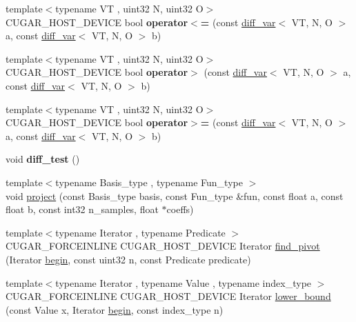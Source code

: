 \begin{DoxyCompactItemize}
\item 
{\footnotesize template$<$typename VT , uint32 N, uint32 O$>$ }\\C\+U\+G\+A\+R\+\_\+\+H\+O\+S\+T\+\_\+\+D\+E\+V\+I\+CE bool {\bfseries operator$<$=} (const \hyperlink{structcugar_1_1diff__var}{diff\+\_\+var}$<$ VT, N, O $>$ a, const \hyperlink{structcugar_1_1diff__var}{diff\+\_\+var}$<$ VT, N, O $>$ b)
\item 
{\footnotesize template$<$typename VT , uint32 N, uint32 O$>$ }\\C\+U\+G\+A\+R\+\_\+\+H\+O\+S\+T\+\_\+\+D\+E\+V\+I\+CE bool {\bfseries operator$>$} (const \hyperlink{structcugar_1_1diff__var}{diff\+\_\+var}$<$ VT, N, O $>$ a, const \hyperlink{structcugar_1_1diff__var}{diff\+\_\+var}$<$ VT, N, O $>$ b)
\item 
{\footnotesize template$<$typename VT , uint32 N, uint32 O$>$ }\\C\+U\+G\+A\+R\+\_\+\+H\+O\+S\+T\+\_\+\+D\+E\+V\+I\+CE bool {\bfseries operator$>$=} (const \hyperlink{structcugar_1_1diff__var}{diff\+\_\+var}$<$ VT, N, O $>$ a, const \hyperlink{structcugar_1_1diff__var}{diff\+\_\+var}$<$ VT, N, O $>$ b)
\item 
\mbox{\label{namespacecugar_a0130f18cbd82a7096ca003e5c529d3f4}} 
void {\bfseries diff\+\_\+test} ()
\item 
{\footnotesize template$<$typename Basis\+\_\+type , typename Fun\+\_\+type $>$ }\\void \hyperlink{namespacecugar_ab80292a294ad672104b9e7d57ae99444}{project} (const Basis\+\_\+type basis, const Fun\+\_\+type \&fun, const float a, const float b, const int32 n\+\_\+samples, float $\ast$coeffs)
\item 
{\footnotesize template$<$typename Iterator , typename Predicate $>$ }\\C\+U\+G\+A\+R\+\_\+\+F\+O\+R\+C\+E\+I\+N\+L\+I\+NE C\+U\+G\+A\+R\+\_\+\+H\+O\+S\+T\+\_\+\+D\+E\+V\+I\+CE Iterator \hyperlink{group___algorithms_module_gaf5c0f35d93fa8af4939155b21c7e2a4f}{find\+\_\+pivot} (Iterator \hyperlink{namespacecugar_a2121df08f967e232ea5fe0ee378dee67}{begin}, const uint32 n, const Predicate predicate)
\item 
{\footnotesize template$<$typename Iterator , typename Value , typename index\+\_\+type $>$ }\\C\+U\+G\+A\+R\+\_\+\+F\+O\+R\+C\+E\+I\+N\+L\+I\+NE C\+U\+G\+A\+R\+\_\+\+H\+O\+S\+T\+\_\+\+D\+E\+V\+I\+CE Iterator \hyperlink{group___algorithms_module_gab5ce2c7f834a31bc40d9101865dec5d1}{lower\+\_\+bound} (const Value x, Iterator \hyperlink{namespacecugar_a2121df08f967e232ea5fe0ee378dee67}{begin}, const index\+\_\+type n)

\end{DoxyCompactItemize}
